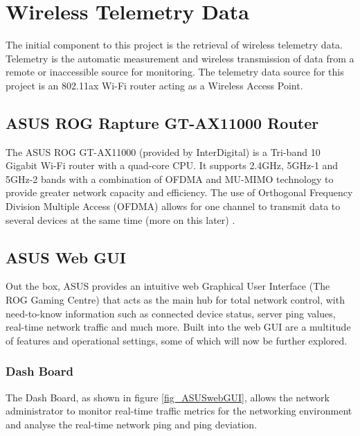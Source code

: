 \section{Wireless Telemetry Data} \label{section:WirelessTelemetryResearch}

The initial component to this project is the retrieval of wireless telemetry data. Telemetry is the automatic measurement and wireless transmission of data from a remote or inaccessible source for monitoring. The telemetry data source for this project is an 802.11ax Wi-Fi router acting as a Wireless Access Point. 

\subsection{ASUS ROG Rapture GT-AX11000 Router}

The ASUS ROG GT-AX11000 (provided by InterDigital) is a Tri-band 10 Gigabit Wi-Fi router with a quad-core CPU. It supports 2.4GHz, 5GHz-1 and 5GHz-2 bands with a combination of OFDMA and MU-MIMO technology to provide greater network capacity and efficiency. The use of Orthogonal Frequency Division Multiple Access (OFDMA) allows for one channel to transmit data to several devices at the same time (more on this later) \cite{OFDMA}. 

\subsection{ASUS Web GUI}

Out the box, ASUS provides an intuitive web Graphical User Interface (The ROG Gaming Centre) that acts as the main hub for total network control, with need-to-know information such as connected device status, server ping values, real-time network traffic and much more. Built into the web GUI are a multitude of features and operational settings, some of which will now be further explored. 

\subsubsection{Dash Board}

The Dash Board, as shown in figure \ref{fig_ASUSwebGUI}, allows the network administrator to monitor real-time traffic metrics for the networking environment and analyse the real-time network ping and ping deviation.


